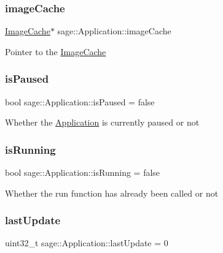\subsubsection{\texorpdfstring{imageCache}{imageCache}}
{\footnotesize\ttfamily \mbox{\hyperlink{classsage_1_1ImageCache}{Image\+Cache}}$\ast$ sage\+::\+Application\+::image\+Cache\hspace{0.3cm}{\ttfamily [protected]}}

Pointer to the \mbox{\hyperlink{classsage_1_1ImageCache}{Image\+Cache}} \mbox{\label{classsage_1_1Application_a2c8135f73ec3091ffcb750dcc280c4d2}} 
\subsubsection{\texorpdfstring{isPaused}{isPaused}}
{\footnotesize\ttfamily bool sage\+::\+Application\+::is\+Paused = false\hspace{0.3cm}{\ttfamily [protected]}}

Whether the \mbox{\hyperlink{classsage_1_1Application}{Application}} is currently paused or not \mbox{\label{classsage_1_1Application_aa5197cd07379bdbc371c26c21f936c17}} 
\subsubsection{\texorpdfstring{isRunning}{isRunning}}
{\footnotesize\ttfamily bool sage\+::\+Application\+::is\+Running = false\hspace{0.3cm}{\ttfamily [protected]}}

Whether the run function has already been called or not \mbox{\label{classsage_1_1Application_a08facf4df89e707b2a07a1be0782643a}} 
\subsubsection{\texorpdfstring{lastUpdate}{lastUpdate}}
{\footnotesize\ttfamily uint32\+\_\+t sage\+::\+Application\+::last\+Update = 0\hspace{0.3cm}{\ttfamily [protected]}}

